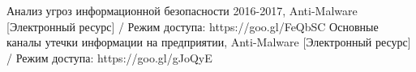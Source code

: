 \begin{thebibliography}{}
	Анализ угроз информационной безопасности 2016-2017, Anti-Malware [Электронный ресурс] / Режим доступа:   https://goo.gl/FeQbSC
	Основные каналы утечки информации на предприятии, Anti-Malware [Электронный ресурс] / Режим доступа:   https://goo.gl/gJoQyE
\end{thebibliography}